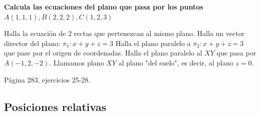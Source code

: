 \begin{problem}
    \textbf{Calcula las ecuaciones del plano que pasa por los puntos $A(1,1,1), B(2,2,2), C(1,2,3)$}

    \solution 

\end{problem}


\begin{problem}
\ppart Halla la ecuación de 2 rectas que pertenezcan al mismo plano.
\ppart Halla un vector director del plano: $\pi_1: x+y+z = 3$
\ppart Halla el plano paralelo a $\pi_2: x+y+z = 3$ que pase por el origen de coordenadas.
\ppart Halla el plano paralelo al $XY$ que pasa por $A(-1,2,-2)$.
\obs Llamamos plano $XY$ al plano "del suelo", es decir, al plano $z=0$.

\ppart Página 283, ejercicios 25-28.

\solution

\end{problem}

\subsection{Posiciones relativas}

